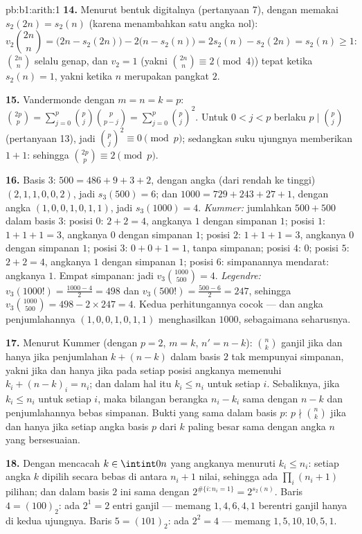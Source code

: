 \begin{solution}{pb:b1:arith:1}
\textbf{14.} Menurut bentuk digitalnya (pertanyaan 7), dengan memakai $s_2(2n) =
s_2(n)$ (karena menambahkan satu angka nol):
\[
v_2\binom{2n}n = \bigl(2n - s_2(2n)\bigr) - 2\bigl(n -
s_2(n)\bigr) = 2s_2(n) - s_2(2n) = s_2(n) \geq 1 :
\]
$\binom{2n}n$ selalu genap, dan $v_2 = 1$ (yakni $\binom{2n}n
\equiv 2 \pmod 4$) tepat ketika $s_2(n) = 1$, yakni ketika $n$ merupakan
pangkat $2$.

\textbf{15.} Vandermonde dengan $m = n = k = p$: $\binom{2p}p =
\sum_{j=0}^p \binom pj\binom p{p-j} = \sum_{j=0}^p \binom pj^2$.
Untuk $0 < j < p$ berlaku $p \mid \binom pj$ (pertanyaan 13), jadi $\binom
pj^2 \equiv 0 \pmod p$; sedangkan suku ujungnya memberikan $1 + 1$:
sehingga $\binom{2p}p \equiv 2 \pmod p$.

\textbf{16.} Basis $3$: $500 = 486 + 9 + 3 + 2$, dengan angka (dari rendah ke
tinggi) $(2, 1, 1, 0, 0, 2)$, jadi $s_3(500) = 6$; dan $1000 = 729 +
243 + 27 + 1$, dengan angka $(1, 0, 0, 1, 0, 1, 1)$, jadi $s_3(1000) = 4$.
\emph{Kummer:} jumlahkan $500 + 500$ dalam basis $3$: posisi $0$: $2 + 2 =
4$, angkanya $1$ dengan simpanan $1$; posisi $1$: $1 + 1 + 1 = 3$, angkanya $0$
dengan simpanan $1$; posisi $2$: $1 + 1 + 1 = 3$, angkanya $0$ dengan simpanan $1$;
posisi $3$: $0 + 0 + 1 = 1$, tanpa simpanan; posisi $4$: $0$;
posisi $5$: $2 + 2 = 4$, angkanya $1$ dengan simpanan $1$; posisi $6$:
simpanannya mendarat: angkanya $1$. Empat simpanan: jadi $v_3\binom{1000}{500} = 4$.
\emph{Legendre:} $v_3(1000!) = \frac{1000 - 4}2 = 498$ dan
$v_3(500!) = \frac{500 - 6}2 = 247$, sehingga $v_3\binom{1000}{500} =
498 - 2\times247 = 4$. Kedua perhitungannya cocok --- dan
angka penjumlahannya $(1, 0, 0, 1, 0, 1, 1)$ menghasilkan $1000$, sebagaimana
seharusnya.

\textbf{17.} Menurut Kummer (dengan $p = 2$, $m = k$, $n' = n - k$):
$\binom nk$ ganjil jika dan hanya jika penjumlahan $k + (n - k)$ dalam basis $2$ tak
mempunyai simpanan, yakni jika dan hanya jika pada setiap posisi angkanya memenuhi $k_i + (n -
k)_i = n_i$; dan dalam hal itu $k_i \leq n_i$ untuk setiap $i$. Sebaliknya,
jika $k_i \leq n_i$ untuk setiap $i$, maka bilangan berangka $n_i -
k_i$ sama dengan $n - k$ dan penjumlahannya bebas simpanan. Bukti yang sama dalam basis
$p$: $p \nmid \binom nk$ jika dan hanya jika setiap angka basis $p$ dari $k$ paling
besar sama dengan angka $n$ yang bersesuaian.

\textbf{18.} Dengan mencacah $k \in \intint0n$ yang angkanya menuruti
$k_i \leq n_i$: setiap angka $k$ dipilih secara bebas di antara
$n_i + 1$ nilai, sehingga ada $\prod_i (n_i + 1)$ pilihan; dan dalam basis $2$
ini sama dengan $2^{\#\{i : n_i = 1\}} = 2^{s_2(n)}$. Baris $4 =
(100)_2$: ada $2^1 = 2$ entri ganjil --- memang $1, 4, 6, 4, 1$ berentri
ganjil hanya di kedua ujungnya. Baris $5 = (101)_2$: ada $2^2 = 4$ --- memang
$1, 5, 10, 10, 5, 1$.


\end{solution}
